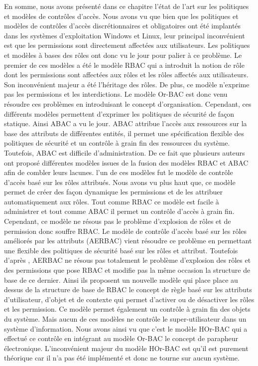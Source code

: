 En somme, nous avons présenté dans ce chapitre l'état de l'art sur les politiques et modèles de contrôles d'accès. Nous avons vu que bien que les politiques et modèles de contrôles d'accès discrétionnaires et obligatoires ont été implantés dans les systèmes d'exploitation Windows et Linux, leur principal inconvénient est que les permissions sont directement affectées aux utilisateurs. Les politiques
et modèles à bases des rôles ont donc vu le jour pour palier à ce problème. Le premier de ces modèles a été le modèle RBAC qui a introduit la notion de rôle dont les permissions sont affectées aux rôles et les rôles affectés aux utilisateurs. Son inconvénient majeur a été l'héritage des rôles. De plus, ce modèle n'exprime pas les permissions et les interdictions. Le modèle Or-BAC est donc venu résoudre ces
problèmes en introduisant le concept d'organisation. Cependant, ces différents modèles permettent d'exprimer les politiques de sécurité de façon statique. Ainsi ABAC a vu le jour. ABAC attribue l'accès aux ressources sur la base des attributs de différentes entités, il permet une spécification flexible des politiques de sécurité et un contrôle à grain fin des ressources du système. Toutefois, ABAC est difficile d'administration. De ce fait que plusieurs auteurs ont proposé différentes modèles issues de la fusion des modèles RBAC et ABAC afin de combler leurs lacunes. l'un de ces modèles fut le modèle de contrôle d'accès basé sur les rôles attribués. Nous avons vu plus haut que, ce modèle permet de créer des façon dynamique les permissions et de les attribuer automatiquement aux rôles. Tout comme RBAC ce modèle est facile à administrer et tout comme ABAC il permet un contrôle d'accès à grain fin. Cependant, ce modèle ne résous pas le problème d'explosion de rôles et de permission donc souffre RBAC. Le modèle de contrôle d'accès basé sur les rôles améliorés par les attributs (AERBAC) vient résoudre ce problème en permettant une  flexible des politiques de sécurité basé sur les rôles et attribut. Toutefois d'après \cite{singh19}, AERBAC ne résous pas totalement le problème d'explosion des rôles et des permissions que pose RBAC et modifie pas la même occasion la structure de base de ce dernier. Ainsi ils proposent un nouvelle modèle qui place place au dessus de la structure de base de RBAC le concept de règle basé sur les attributs d'utilisateur, d'objet et de contexte qui permet d'activer ou de désactiver les rôles et les permission. Ce modèle permet également un contrôle à grain fin des objets du système. Mais aucun de ces modèles ne contrôle le super-utilisateur dans un système d'information. Nous avons ainsi vu que c'est le modèle HOr-BAC qui a effectué ce contrôle en intégrant au modèle Or-BAC le concept de parapheur électronique. L'inconvénient majeur du modèle HOr-BAC est qu'il est purement théorique car il n'a pas été implémenté et donc ne tourne sur aucun système.

